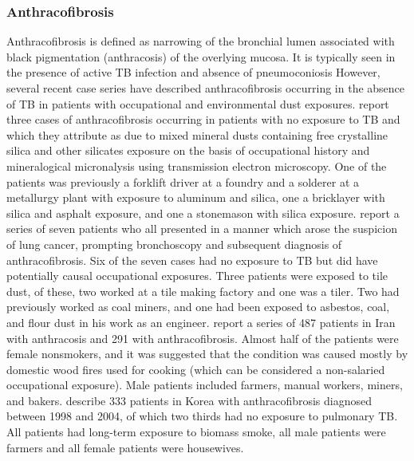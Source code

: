 \documentclass[a4
er,12pt]{article}
\begin{document}
\subsubsection{Anthracofibrosis}
Anthracofibrosis is defined as narrowing of the bronchial lumen associated with black pigmentation (anthracosis) of the overlying mucosa. It is typically seen in the presence of active TB infection and absence of pneumoconiosis  However, several recent case series have described anthracofibrosis occurring in the absence of TB in patients with occupational and environmental dust exposures. \cite{Naccache2008} report three cases of anthracofibrosis occurring in patients with no exposure to TB and which they attribute as due to mixed mineral dusts containing free crystalline silica and other silicates exposure on the basis of occupational history and mineralogical micronalysis using transmission electron microscopy. One of the patients was previously a forklift driver at a foundry and a solderer at a metallurgy plant with exposure to aluminum and silica, one a bricklayer with silica and asphalt exposure, and one a stonemason with silica exposure.
\cite{Wynn2008} report a series of seven patients who all presented in a manner which arose the suspicion of lung cancer, prompting bronchoscopy and subsequent diagnosis of anthracofibrosis. Six of the seven cases had no exposure to TB but did have potentially causal occupational exposures. Three patients were exposed to tile dust, of these, two worked at a tile making factory and one was a tiler. Two had previously worked as coal miners, and one had been exposed to asbestos, coal, and flour dust in his work as an engineer.
\cite{Sigari2009} report a series of 487 patients in Iran with anthracosis and 291 with anthracofibrosis.  Almost half of the patients were female nonsmokers, and it was suggested that the condition was caused mostly by domestic wood fires used for cooking (which can be considered a non-salaried occupational exposure). Male patients included farmers, manual workers, miners, and bakers.\cite{Kim2009} describe 333 patients in Korea with anthracofibrosis diagnosed between 1998 and 2004, of which two thirds had no exposure to pulmonary TB. All patients had long-term exposure to biomass smoke, all male patients were farmers and all female patients were housewives.
\end{document}
